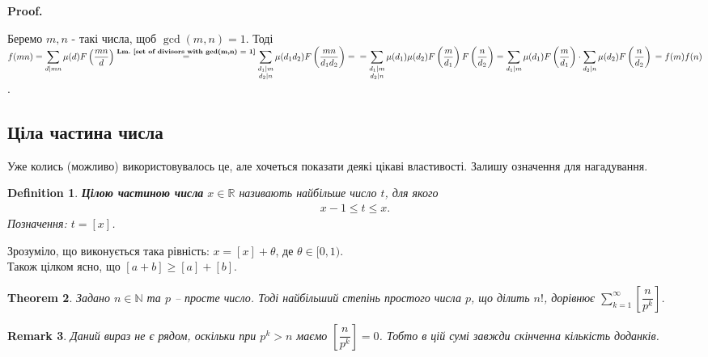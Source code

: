 \documentclass[a4paper, 14pt]{extarticle}
\makeatletter
\theoremstyle{theoremdd}
\newtheorem{theorem}{Theorem}[subsection]
\theoremstyle{theoremdd}
\newtheorem{definition}[theorem]{Definition}
\theoremstyle{theoremdd}
\theoremstyle{theoremdd}
\theoremstyle{theoremdd}
\theoremstyle{theoremdd}
\newtheorem{remark}[theorem]{Remark}
\theoremstyle{theoremdd}
\theoremstyle{theoremdd}
\def\qed{$\blacksquare$}
\renewenvironment{proof}[1][Proof.\\]{\par
\pushQED{\hfill \qed}%
\normalfont \topsep6\p@\@plus6\p@\relax
\trivlist
\item\relax
{\bfseries
#1\@addpunct{.}}\hspace\labelsep\ignorespaces
}{%
\popQED\endtrivlist\@endpefalse
}
\newcommand\lmref[1]{\textbf{Lm.~\ref{#1}}}
\makeatother
\begin{document}
\begin{proof}
Беремо $m,n$ - такі числа, щоб $\gcd(m,n) = 1$. Тоді\\
$f(mn) = \displaystyle\sum_{d \mid mn} \mu(d) F\left( \dfrac{mn}{d} \right) \overset{\text{\lmref{set of divisors with gcd(m,n) = 1}}}{=} \sum_{\substack{d_1 \mid m \\ d_2 \mid n}} \mu(d_1d_2) F\left( \dfrac{mn}{d_1d_2} \right) = \\ = \sum_{\substack{d_1 \mid m \\ d_2 \mid n}} \mu(d_1) \mu(d_2) F\left( \dfrac{m}{d_1} \right) F\left( \dfrac{n}{d_2} \right) = \sum_{d_1 \mid m} \mu(d_1) F\left( \dfrac{m}{d_1} \right) \cdot \sum_{d_2 \mid n} \mu(d_2) F\left( \dfrac{n}{d_2} \right) \\ = f(m)f(n)$.
\end{proof}

\subsection{Ціла частина числа}
Уже колись (можливо) використовувалось це, але хочеться показати деякі цікаві властивості. Залишу означення для нагадування.

\begin{definition}
\textbf{Цілою частиною числа} $x \in \mathbb{R}$ називають найбільше число $t$, для якого
\begin{align*}
x-1 \leq t \leq x.
\end{align*}
Позначення: $t = [x]$.
\end{definition}

Зрозуміло, що виконується така рівність: $x = [x] + \theta$, де $\theta \in [0,1)$.\\
Також цілком ясно, що $[a+b] \geq [a] + [b]$.

\begin{theorem}
Задано $n \in \mathbb{N}$ та $p$ -- просте число. Тоді найбільший степінь простого числа $p$, що ділить $n!$, дорівнює $\displaystyle\sum_{k=1}^\infty \left[ \dfrac{n}{p^k} \right]$.
\end{theorem}

\begin{remark}
Даний вираз не є рядом, оскільки при $p^k > n$ маємо $\left[ \dfrac{n}{p^k} \right] = 0$. Тобто в цій сумі завжди скінченна кількість доданків.
\end{remark}
\end{document}
